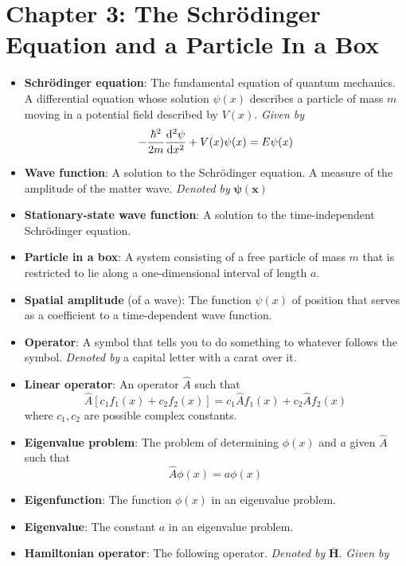 \documentclass[../notes.tex]{subfiles}
\begin{document}
\section{Chapter 3: The Schr\"{o}dinger Equation and a Particle In a Box}
\begin{itemize}
    \item \textbf{Schr\"{o}dinger equation}: The fundamental equation of quantum mechanics. A differential equation whose solution $\psi(x)$ describes a particle of mass $m$ moving in a potential field described by $V(x)$. \emph{Given by}
    \begin{equation*}
        -\frac{\hbar^2}{2m}\dv[2]{\psi}{x}+V(x)\psi(x) = E\psi(x)
    \end{equation*}
    \item \textbf{Wave function}: A solution to the Schr\"{o}dinger equation. A measure of the amplitude of the matter wave. \emph{Denoted by} $\bm{\psi(x)}$
    \item \textbf{Stationary-state wave function}: A solution to the time-independent Schr\"{o}dinger equation.
    \item \textbf{Particle in a box}: A system consisting of a free particle of mass $m$ that is restricted to lie along a one-dimensional interval of length $a$.
    \item \textbf{Spatial amplitude} (of a wave): The function $\psi(x)$ of position that serves as a coefficient to a time-dependent wave function.
    \item \textbf{Operator}: A symbol that tells you to do something to whatever follows the symbol. \emph{Denoted by} a capital letter with a carat over it.
    \item \textbf{Linear operator}: An operator $\hat{A}$ such that
    \begin{equation*}
        \hat{A}[c_1f_1(x)+c_2f_2(x)] = c_1\hat{A}f_1(x)+c_2\hat{A}f_2(x)
    \end{equation*}
    where $c_1,c_2$ are possible complex constants.
    \item \textbf{Eigenvalue problem}: The problem of determining $\phi(x)$ and $a$ given $\hat{A}$ such that
    \begin{equation*}
        \hat{A}\phi(x) = a\phi(x)
    \end{equation*}
    \item \textbf{Eigenfunction}: The function $\phi(x)$ in an eigenvalue problem.
    \item \textbf{Eigenvalue}: The constant $a$ in an eigenvalue problem.
    \item \textbf{Hamiltonian operator}: The following operator. \emph{Denoted by} $\bm{\bar{H}}$. \emph{Given by}

\end{itemize}
\end{document}
